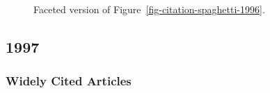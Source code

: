 \documentclass[
  10pt,
  letterpaper,
  DIV=11,
  numbers=noendperiod,
  twoside]{scrartcl}
\begin{document}
\begin{figure}


\caption{\label{fig-citation-facet-1996}Faceted version of
Figure~\ref{fig-citation-spaghetti-1996}.}

\end{figure}%

\newpage

\subsection{1997}\label{sec-s1997}

\subsubsection*{Widely Cited Articles}\label{widely-cited-articles-41}
\end{document}
